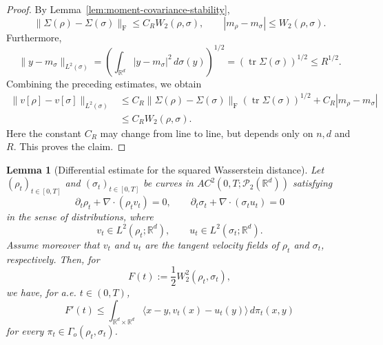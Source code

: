 \documentclass[11pt,reqno]{amsart}
\numberwithin{figure}{section}
\newcommand{\bbr}{\mathbb R}
\newcommand{\dm}{d}
\newtheorem{lemma}{Lemma}[section]
\begin{document}
\begin{proof}
By Lemma~\ref{lem:moment-covariance-stability},
\[
\|\Sigma(\rho)-\Sigma(\sigma)\|_{\mathrm F}
\le
C_R W_2(\rho,\sigma),
\qquad
|m_\rho-m_\sigma|
\le
W_2(\rho,\sigma).
\]
Furthermore,
\[
\|y-m_\sigma\|_{L^2(\sigma)}
=
\left(
\int_{\mathbb R^d}|y-m_\sigma|^2\,d\sigma(y)
\right)^{1/2}
=
\left(\operatorname{tr}\Sigma(\sigma)\right)^{1/2}
\le
R^{1/2}.
\]
Combining the preceding estimates, we obtain
\[
\begin{aligned}
\|v[\rho]-v[\sigma]\|_{L^2(\sigma)}
&\le
C_R\|\Sigma(\rho)-\Sigma(\sigma)\|_{\mathrm F}
\left(\operatorname{tr}\Sigma(\sigma)\right)^{1/2}
+
C_R|m_\rho-m_\sigma| \\
&\le
C_R W_2(\rho,\sigma).
\end{aligned}
\]
Here the constant $C_R$ may change from line to line, but depends only on
$n,d$ and $R$. This proves the claim.
\end{proof}


\begin{lemma}[Differential estimate for the squared Wasserstein distance]
\label{lem:W2-differential-estimate}
Let $(\rho_t)_{t\in[0,T]}$ and $(\sigma_t)_{t\in[0,T]}$ be curves in
$AC^2(0,T;\mathcal P_2(\mathbb R^d))$ satisfying
\[
\partial_t\rho_t+\nabla\cdot(\rho_t v_t)=0,
\qquad
\partial_t\sigma_t+\nabla\cdot(\sigma_t u_t)=0
\]
in the sense of distributions, where
\[
v_t\in L^2(\rho_t;\mathbb R^d),
\qquad
u_t\in L^2(\sigma_t;\mathbb R^d).
\]
Assume moreover that $v_t$ and $u_t$ are the tangent velocity fields of
$\rho_t$ and $\sigma_t$, respectively. Then, for
\[
F(t):=\frac12 W_2^2(\rho_t,\sigma_t),
\]
we have, for a.e. $t\in(0,T)$,
\[
F'(t)
\le
\int_{\mathbb R^{d}\times\bbr^\dm}
\langle x-y, v_t(x)-u_t(y)\rangle\,d\pi_t(x,y)
\]
for every $\pi_t\in\Gamma_o(\rho_t,\sigma_t)$.
\end{lemma}
\end{document}
